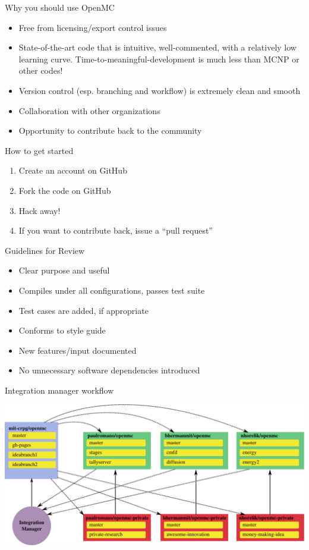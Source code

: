 \documentclass[noamssymb,svgnames]{beamer}
\begin{document}
\begin{frame}{Why you should use OpenMC}
  \begin{itemize}
  \item Free from licensing/export control issues
  \item State-of-the-art code that is intuitive, well-commented, with a
    relatively low learning curve. Time-to-meaningful-development is much less
    than MCNP or other codes!
  \item Version control (esp. branching and workflow) is extremely clean and
    smooth
  \item Collaboration with other organizations
  \item Opportunity to contribute back to the community
  \end{itemize}
\end{frame}

\begin{frame}{How to get started}
  \begin{enumerate}
  \item Create an account on GitHub
  \item Fork the code on GitHub
  \item Hack away!
  \item If you want to contribute back, issue a ``pull request''
  \end{enumerate}
\end{frame}

\begin{frame}{Guidelines for Review}
  \begin{itemize}
  \item Clear purpose and useful
  \item Compiles under all configurations, passes test suite
  \item Test cases are added, if appropriate
  \item Conforms to style guide
  \item New features/input documented
  \item No unnecessary software dependencies introduced
  \end{itemize}
\end{frame}

\begin{frame}{Integration manager workflow}
  \begin{center}
    \includegraphics[width=\textwidth]{../images/integration-manager.pdf}
  \end{center}
\end{frame}
\end{document}
